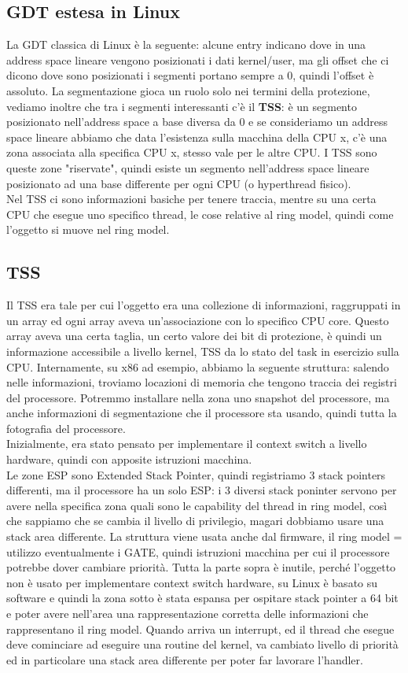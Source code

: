 \documentclass[12pt, oneside]{extbook}
\begin{document}
\subsection{GDT estesa in Linux}
La GDT classica di Linux è la seguente:
alcune entry indicano dove in una address space lineare vengono posizionati i dati kernel/user, ma gli offset che ci dicono dove sono posizionati i segmenti portano sempre a 0, quindi l'offset è assoluto. La segmentazione gioca un ruolo solo nei termini della protezione, vediamo inoltre che tra i segmenti interessanti c'è il \textbf{TSS}: è un segmento posizionato nell'address space a base diversa da 0 e se consideriamo un address space lineare abbiamo che data l'esistenza sulla macchina della CPU x, c'è una zona associata alla specifica CPU x, stesso vale per le altre CPU. I TSS sono queste zone "riservate", quindi esiste un segmento nell'address space lineare posizionato ad una base differente per ogni CPU (o hyperthread fisico).\\ Nel TSS ci sono informazioni basiche per tenere traccia, mentre su una certa CPU che esegue uno specifico thread, le cose relative al ring model, quindi come l'oggetto si muove nel ring model.
\subsection{TSS}
Il TSS era tale per cui l'oggetto era una collezione di informazioni, raggruppati in un array ed ogni array aveva un'associazione con lo specifico CPU core. Questo array aveva una certa taglia, un certo valore dei bit di protezione, è quindi un informazione accessibile a livello kernel, TSS da lo stato del task in esercizio sulla CPU. Internamente, su x86 ad esempio, abbiamo la seguente struttura:
salendo nelle informazioni, troviamo locazioni di memoria che tengono traccia dei registri del processore. Potremmo installare nella zona uno snapshot del processore, ma anche informazioni di segmentazione che il processore sta usando, quindi tutta la fotografia del processore.\\ Inizialmente, era stato pensato per implementare il context switch a livello hardware, quindi con apposite istruzioni macchina.\\ Le zone ESP sono Extended Stack Pointer, quindi registriamo 3 stack pointers differenti, ma il processore ha un solo ESP: i 3 diversi stack poninter servono per avere nella specifica zona quali sono le capability del thread in ring model, così che sappiamo che se cambia il livello di privilegio, magari dobbiamo usare una stack area differente. La struttura viene usata anche dal firmware, il ring model = utilizzo eventualmente i GATE, quindi istruzioni macchina per cui il processore potrebbe dover cambiare priorità. Tutta la parte sopra è inutile, perché l'oggetto non è usato per implementare context switch hardware, su Linux è basato su software e quindi la zona sotto è stata espansa per ospitare stack pointer a 64 bit e poter avere nell'area una rappresentazione corretta delle informazioni che rappresentano il ring model. Quando arriva un interrupt, ed il thread che esegue deve cominciare ad eseguire una routine del kernel, va cambiato livello di priorità ed in particolare una stack area differente per poter far lavorare l'handler.
\end{document}
